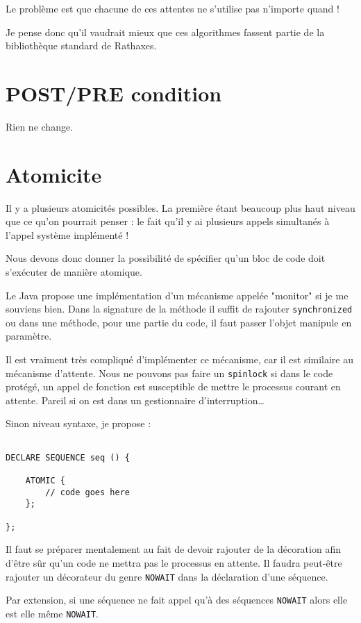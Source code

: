 \documentclass[french]{rtxreport}
\begin{document}
Le problème est que chacune de ces attentes ne s’utilise pas n’importe quand !

Je pense donc qu’il vaudrait mieux que ces algorithmes fassent partie de la bibliothèque standard de Rathaxes.

\section{POST/PRE condition}

Rien ne change.

\section{Atomicite}
Il y a plusieurs atomicités possibles. La première étant beaucoup plus haut niveau que ce qu’on pourrait penser : le fait qu’il y ai plusieurs appels simultanés à l’appel système implémenté !

Nous devons donc donner la possibilité de spécifier qu’un bloc de code doit s’exécuter de manière atomique.

Le Java propose une implémentation d’un mécanisme appelée "monitor" si je me souviens bien. Dans la signature de la méthode il suffit de rajouter \texttt{synchronized} ou dans une méthode, pour une partie du code, il faut passer l’objet manipule en paramètre.

Il est vraiment très compliqué d’implémenter ce mécanisme, car il est similaire au mécanisme d’attente. Nous ne pouvons pas faire un \texttt{spinlock} si dans le code protégé, un appel de fonction est susceptible de mettre le processus courant en attente. Pareil si on est dans un gestionnaire d’interruption\ldots

Sinon niveau syntaxe, je propose :
\begin{lstlisting}

DECLARE SEQUENCE seq () {

	ATOMIC {
		// code goes here
	};

};

\end{lstlisting}

Il faut se préparer mentalement au fait de devoir rajouter de la décoration afin d’être sûr qu’un code ne mettra pas le processus en attente. Il faudra peut-être rajouter un décorateur du genre \texttt{NOWAIT} dans la déclaration d’une séquence.

Par extension, si une séquence ne fait appel qu’à des séquences \texttt{NOWAIT} alors elle est elle même \texttt{NOWAIT}.
\end{document}
